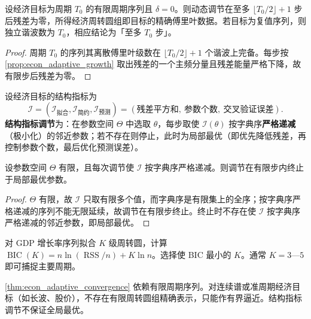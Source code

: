 \begin{theorem}[动态调节的收敛性]\label{thm:econ_adaptive_convergence}
设经济目标为周期 $T_0$ 的有限周期序列且 $\delta=0$。则动态调节在至多 $\lfloor T_0/2\rfloor+1$ 步后残差为零，所得经济周转圆组即目标的精确傅里叶数据。若目标为复值序列，则独立谐波数为 $T_0$，相应结论为「至多 $T_0$ 步」。
\end{theorem}

\begin{proof}
周期 $T_0$ 的序列其离散傅里叶级数在 $\lfloor T_0/2\rfloor+1$ 个谐波上完备。每步按 \cref{prop:econ_adaptive_growth} 取出残差的一个主频分量且残差能量严格下降，故有限步后残差为零。
\end{proof}

\begin{definition}[结构指标调节]\label{def:econ_structure_metric_adjustment}
设经济目标的结构指标为
\[
\mathcal I=(\mathcal I_{\text{拟合}},\mathcal I_{\text{简约}},\mathcal I_{\text{预测}})
=(\text{残差平方和},\ \text{参数个数},\ \text{交叉验证误差}).
\]
\textbf{结构指标调节}为：在参数空间 $\Theta$ 中选取 $\theta$，每步取使 $\mathcal I(\theta)$ 按字典序\textbf{严格递减}（极小化）的邻近参数；若不存在则停止，此时为局部最优（即优先降低残差，再控制参数个数，最后优化预测误差）。
\end{definition}

\begin{proposition}[结构指标调节的有限收敛]\label{prop:econ_structure_metric_convergence}
设参数空间 $\Theta$ 有限，且每次调节使 $\mathcal I$ 按字典序严格递减。则调节在有限步内终止于局部最优参数。
\end{proposition}

\begin{proof}
$\Theta$ 有限，故 $\mathcal I$ 只取有限多个值，而字典序是有限集上的全序；按字典序严格递减的序列不能无限延续，故调节在有限步终止。终止时不存在使 $\mathcal I$ 按字典序严格递减的邻近参数，即局部最优。
\end{proof}

\begin{example}\label{ex:econ_bic}
对 GDP 增长率序列拟合 $K$ 级周转圆，计算 $\operatorname{BIC}(K)=n\ln(\operatorname{RSS}/n)+K\ln n$。选择使 BIC 最小的 $K$。通常 $K=3$—$5$ 即可捕捉主要周期。
\end{example}

\begin{remark}[动态调节的边界]\label{rem:econ_adaptive_boundary}
\cref{thm:econ_adaptive_convergence} 依赖有限周期序列。对连续谱或准周期经济目标（如长波、股价），不存在有限周转圆组精确表示，只能作有界逼近。结构指标调节不保证全局最优。
\end{remark}

